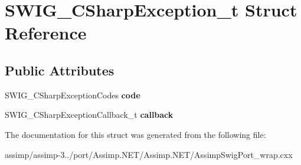 \hypertarget{struct_s_w_i_g___c_sharp_exception__t}{\section{S\+W\+I\+G\+\_\+\+C\+Sharp\+Exception\+\_\+t Struct Reference}
\label{struct_s_w_i_g___c_sharp_exception__t}
}
\subsection*{Public Attributes}
\begin{DoxyCompactItemize}
\item 
\hypertarget{struct_s_w_i_g___c_sharp_exception__t_aafa02b02869cd0423dcee68c867b4e53}{S\+W\+I\+G\+\_\+\+C\+Sharp\+Exception\+Codes {\bfseries code}}\label{struct_s_w_i_g___c_sharp_exception__t_aafa02b02869cd0423dcee68c867b4e53}

\item 
\hypertarget{struct_s_w_i_g___c_sharp_exception__t_a6dccb706a135c7f0e48102b3b528f2bc}{S\+W\+I\+G\+\_\+\+C\+Sharp\+Exception\+Callback\+\_\+t {\bfseries callback}}\label{struct_s_w_i_g___c_sharp_exception__t_a6dccb706a135c7f0e48102b3b528f2bc}

\end{DoxyCompactItemize}


The documentation for this struct was generated from the following file\+:\begin{DoxyCompactItemize}
\item 
assimp/assimp-\/3../port/\+Assimp.\+N\+E\+T/\+Assimp.\+N\+E\+T/Assimp\+Swig\+Port\+\_\+wrap.\+cxx\end{DoxyCompactItemize}
